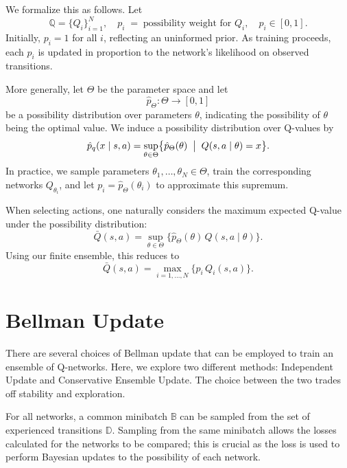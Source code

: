 \documentclass[11pt,a4paper]{report}
\begin{document}
We formalize this as follows. Let
\[
\mathbb{Q} = \{Q_i\}_{i=1}^N,\quad
p_i \;=\;\text{possibility weight for }Q_i,\quad
p_i\in[0,1].
\]
Initially, \(p_i = 1\) for all \(i\), reflecting an uninformed prior. As training proceeds, each \(p_i\) is updated in proportion to the network’s likelihood on observed transitions.

More generally, let \(\Theta\) be the parameter space and let
\[
\hat{p}_\Theta:\Theta\to[0,1]
\]
be a possibility distribution over parameters \(\theta\), indicating the possibility of $\theta$ being the optimal value. We induce a possibility distribution over Q-values by
\[
\hat{p}_q(x\mid s,a)
=\sup_{\theta\in\Theta}\bigl\{\hat{p}_\Theta(\theta)\;\bigm|\;Q(s,a\mid\theta)=x\bigr\}.
\]
In practice, we sample parameters \(\theta_1,\dots,\theta_N\in\Theta\), train the corresponding networks \(Q_{\theta_i}\), and let \(p_i = \hat{p}_\Theta(\theta_i)\) to approximate this supremum.

When selecting actions, one naturally considers the maximum expected Q-value under the possibility distribution:
\[ \bar{Q}(s,a) =\sup_{\theta\in\Theta}\bigl\{\hat{p}_\Theta(\theta)\,Q(s,a\mid\theta)\bigr\}. \]
Using our finite ensemble, this reduces to
\[ \bar{Q}(s,a) =\max_{i=1,\dots,N}\bigl\{p_i\,Q_i(s,a)\bigr\}. \]
\section{Bellman Update}
There are several choices of Bellman update that can be employed to train an ensemble of Q-networks. Here, we explore two different methods: Independent Update and Conservative Ensemble Update. The choice between the two trades off stability and exploration.

For all networks, a common minibatch \(\mathbb{B}\) can be sampled from the set of experienced transitions \(\mathbb{D}\). Sampling from the same minibatch allows the losses calculated for the networks to be compared; this is crucial as the loss is used to perform Bayesian updates to the possibility of each network.
\end{document}
